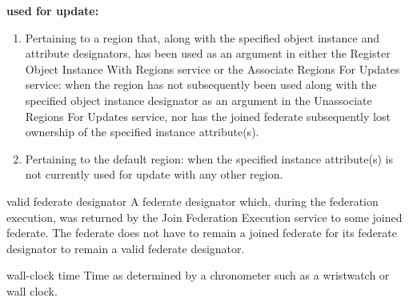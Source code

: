 \par\noindent\textbf{used for update:}\par

\begin{enumerate}[label=\alph*)]
\item Pertaining to a region that, along with the specified object instance and attribute designators, has been used as an argument in either the Register Object Instance With Regions service or the Associate Regions For Updates service: when the region has not subsequently been used along with the specified object instance designator as an argument in the Unassociate Regions For Updates service, nor has the joined federate subsequently lost ownership of the specified instance attribute(s).
\par{}
\item Pertaining to the default region: when the specified instance attribute(s) is not currently used for update with any other region.
\par{}
\end{enumerate}

\begin{definition}{valid federate designator}
    A federate designator which, during the federation execution, was returned by the Join Federation Execution service to some joined federate. The federate does not have to remain a joined federate for its federate designator to remain a valid federate designator.
\end{definition}

\begin{definition}{wall-clock time}
    Time as determined by a chronometer such as a wristwatch or wall clock.
\end{definition}
